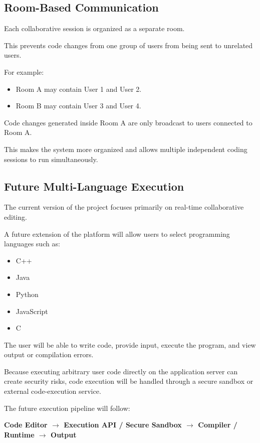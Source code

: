 \documentclass[11pt,letterpaper]{article}
\begin{document}
\subsection{Room-Based Communication}

Each collaborative session is organized as a separate room.

This prevents code changes from one group of users from being sent to unrelated users.

For example:

\begin{itemize}
    \item Room A may contain User 1 and User 2.
    \item Room B may contain User 3 and User 4.
\end{itemize}

Code changes generated inside Room A are only broadcast to users connected to Room A.

This makes the system more organized and allows multiple independent coding sessions to run simultaneously.


\subsection{Future Multi-Language Execution}

The current version of the project focuses primarily on real-time collaborative editing.

A future extension of the platform will allow users to select programming languages such as:

\begin{itemize}
    \item C++
    \item Java
    \item Python
    \item JavaScript
    \item C
\end{itemize}

The user will be able to write code, provide input, execute the program, and view output or compilation errors.

Because executing arbitrary user code directly on the application server can create security risks, code execution will be handled through a secure sandbox or external code-execution service.

The future execution pipeline will follow:

\begin{center}
\textbf{
Code Editor $\rightarrow$
Execution API / Secure Sandbox $\rightarrow$
Compiler / Runtime $\rightarrow$
Output
}
\end{center}
\end{document}
